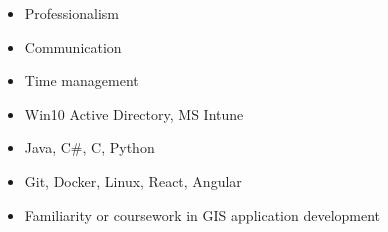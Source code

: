 \begin{itemize}
    \item Professionalism
    \item Communication
    \item Time management
    \item Win10 Active Directory, MS Intune
    \item Java, C\#, C, Python
    \item Git, Docker, Linux, React, Angular
    \item Familiarity or coursework in GIS application development
\end{itemize}
